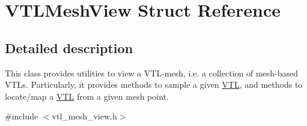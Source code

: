 \hypertarget{struct_v_t_l_mesh_view}{}\section{V\+T\+L\+Mesh\+View Struct Reference}
\label{struct_v_t_l_mesh_view}


\subsection{Detailed description}
This class provides utilities to view a V\+T\+L-\/mesh, i.\+e. a collection of mesh-\/based V\+T\+Ls. Particularly, it provides methods to sample a given \hyperlink{struct_v_t_l}{V\+TL}, and methods to locate/map a \hyperlink{struct_v_t_l}{V\+TL} from a given mesh point. 

{\ttfamily \#include $<$vtl\+\_\+mesh\+\_\+view.\+h$>$}

